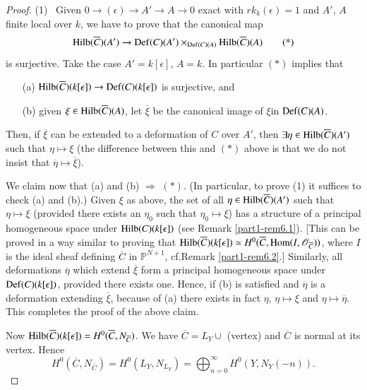 {\begin{proof}
(1)~ Given $0\to (\epsilon)\to A'\to A\to 0$ exact with
  $rk_{k}(\epsilon)=1$ and $A'$, $A$ finite local over $k$, we have to
  prove that the canonical map 
\begin{equation*}
\operatorname{Hilb}(\overline{C})(A')\to
\operatorname{Def}(C)(A')\times_{\operatorname{Def}(C)(A)}\operatorname{Hilb}(\overline{C})(A) \tag{*}
\end{equation*}\pageoriginale
is surjective. Take the case $A'=k[\epsilon]$, $A=k$. In particular
$(*)$ implies that 
\begin{itemize}
\item[(a)] $\operatorname{Hilb}(\overline{C})(k[\epsilon])\to \operatorname{Def}(C)(k[\epsilon])$
  is surjective, and

\item[(b)] given $\xi\in \operatorname{Hilb}(\overline{C})(A)$, let $\overline{\xi}$
  be the canonical image of $\xi$\break in $\operatorname{Def}(C)(A)$.
\end{itemize}

Then, if $\overline{\xi}$ can be extended to a deformation of $C$ over
$A'$, then $\exists \eta \in \operatorname{Hilb}(\overline{C})(A')$ such that
$\eta\mapsto \xi$ (the difference between this and $(*)$ above is that
we do not insist that $\overline{\eta}\mapsto \overline{\xi}$).


We claim now that (a) and (b) $\Rightarrow$ $(*)$. (In particular, to
prove (1) it suffices to check (a) and (b).) Given $\xi$ as above, the
set of all $\eta\in \operatorname{Hilb}(\overline{C})(A')$ such that $\eta\mapsto
\xi$ (provided there exists an $\eta_{0}$ such that $\eta_{0}\mapsto
\xi$) has a structure of a principal homogeneous space under
$\operatorname{Hilb}(C)(k[\epsilon])$ (see Remark \ref{part1-rem6.1}). [This can be
  proved in a way similar to proving that
  $\operatorname{Hilb}(\overline{C})(k[\epsilon])\simeq
  H^{0}(\overline{C},\operatorname{Hom}(I,\mathscr{O}_{\overline{C}}))$, where $I$
  is the ideal sheaf defining $\overline{C}$ in $\mathbb{P}^{N+1}$,
  cf.\@ Remark \ref{part1-rem6.2}.] Similarly, all deformations
$\overline{\eta}$ which extend $\overline{\xi}$ form a principal
homogeneous space under $\operatorname{Def}(C)(k[\epsilon])$, provided there exists
one. Hence, if (b) is satisfied and $\overline{\eta}$ is a deformation
extending $\overline{\xi}$, because of (a) there exists in fact
$\eta$, $\eta\mapsto \xi$ and $\eta\mapsto\overline{\eta}$. This
completes the proof of the above claim.

Now
$\operatorname{Hilb}(\overline{C})(k[\epsilon])=H^{0}(\overline{C},N_{\overline{C}})$. We
have $\overline{C}=L_{Y}\cup$ (vertex) and $\overline{C}$ is normal at
its vertex. Hence
$$
H^{0}(\overline{C},N_{\overline{C}})=H^{0}(L_{Y},N_{L_{Y}})=\bigoplus^{\infty}_{n=0}H^{0}(Y,N_{Y}(-n)). 
$$


\end{proof}}
